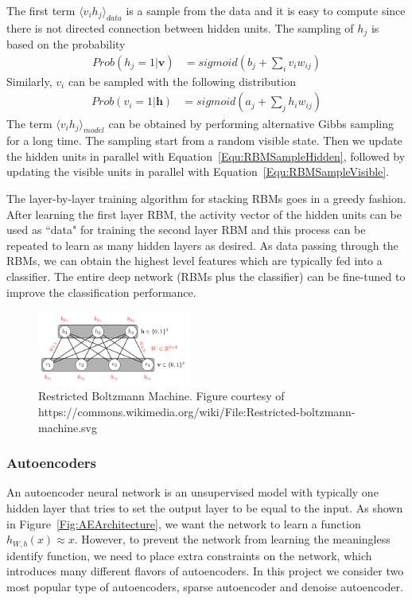 The first term $\langle v_i h_j \rangle_{data}$ is a sample from the data and it is easy to
compute since there is not directed connection between hidden units.
The sampling of $h_j$ is based on the probability
\begin{align}
        Prob(h_j = 1 | \mathbf{v}) &= sigmoid(b_j + \sum_i{v_i w_{ij}})
\label{Equ:RBMSampleHidden}
\end{align}
Similarly, $v_i$ can be sampled with the following distribution
\begin{align}
        Prob(v_i = 1 | \mathbf{h}) &= sigmoid(a_j + \sum_j{h_i w_{ij}})
\label{Equ:RBMSampleVisible}
\end{align}
The term $\langle v_i h_j \rangle_{model}$ can be obtained by performing alternative Gibbs
sampling for a long time.
The sampling start from a random visible state.
Then we update the hidden units in parallel with Equation~\ref{Equ:RBMSampleHidden},
followed by updating the visible units in parallel with Equation~\ref{Equ:RBMSampleVisible}.

The layer-by-layer training algorithm for stacking RBMs goes in a greedy fashion.
After learning the first layer RBM, the activity vector of the hidden units can be used
as ``data" for training the second layer RBM
and this process can be repeated to learn as many hidden layers as desired.
As data passing through the RBMs, we can obtain the highest level features 
which are typically fed into a classifier.
The entire deep network (RBMs plus the classifier) can be fine-tuned to
improve the classification performance.


\begin{figure}[h]
\centering
\includegraphics[width=0.45\textwidth]{figures/rbm.png}
\caption{Restricted Boltzmann Machine.
        Figure courtesy of https://commons.wikimedia.org/wiki/File:Restricted-boltzmann-machine.svg}
\label{Fig:RBMArchitecture}
\end{figure}



\subsubsection{Autoencoders}
An autoencoder neural network is an unsupervised model with typically one hidden layer that
tries to set the output layer to be equal to the input.
As shown in Figure~\ref{Fig:AEArchitecture}, we want the network to
learn a function $h_{W, b}(x) \approx x$.
However, to prevent the network from learning the meaningless identify function,
we need to place extra constraints on the network, which introduces many different
flavors of autoencoders.
In this project we consider two most popular type of autoencoders, sparse autoencoder and
denoise autoencoder.

